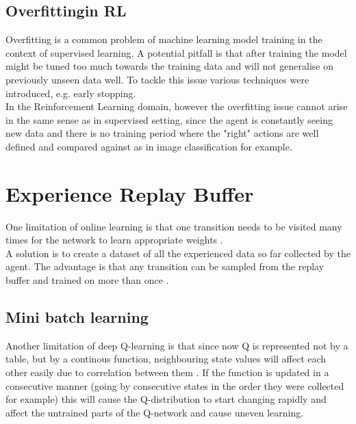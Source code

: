 \subsection{Overfittingin RL}

Overfitting is a common problem of machine learning 
model training in the context of supervised learning.
A potential pitfall is that after training the model
might be tuned too much towards the training data
and will not generalise on previously unseen data well.
To tackle this issue various techniques were introduced, 
e.g. early stopping. \\

In the Reinforcement Learning domain, however the 
overfitting issue cannot arise in the same sense as in
supervised setting, since the agent is constantly 
seeing new data and there is no training period where
the "right" actions are well defined and compared against
as in image classification for example.


\section{Experience Replay Buffer}

One limitation of online learning is that one transition needs to be visited many times for the network to learn appropriate weights \cite{lecture_dqn}.\\

A solution is to create a dataset of all the experienced data so far collected by the agent. The advantage is that any transition can be sampled from the replay buffer and trained on more than once \cite{lecture_dqn}. 

\subsection{Mini batch learning }

Another limitation of deep Q-learning is that since now Q is represented not by a table, but by a continous function, neighbouring state values will affect each other easily due to correlation between them \cite{lecture_dqn} . If the function is updated in a consecutive manner (going by consecutive states in the order they were collected for example) this will cause the Q-distribution to start changing rapidly and affect the untrained parts of the Q-network and cause uneven learning. \\

